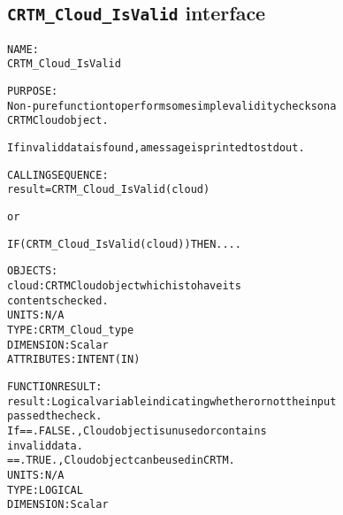 \subsection{\texttt{CRTM\_Cloud\_IsValid} interface}
  \label{sec:CRTM_Cloud_IsValid_interface}
  \begin{alltt}
 
  NAME:
        CRTM_Cloud_IsValid
 
  PURPOSE:
        Non-pure function to perform some simple validity checks on a
        CRTM Cloud object. 
 
        If invalid data is found, a message is printed to stdout.
 
  CALLING SEQUENCE:
        result = CRTM_Cloud_IsValid( cloud )
 
          or
 
        IF ( CRTM_Cloud_IsValid( cloud ) ) THEN....
 
  OBJECTS:
        cloud:         CRTM Cloud object which is to have its
                       contents checked.
                       UNITS:      N/A
                       TYPE:       CRTM_Cloud_type
                       DIMENSION:  Scalar
                       ATTRIBUTES: INTENT(IN)
 
  FUNCTION RESULT:
        result:        Logical variable indicating whether or not the input
                       passed the check.
                       If == .FALSE., Cloud object is unused or contains
                                      invalid data.
                          == .TRUE.,  Cloud object can be used in CRTM.
                       UNITS:      N/A
                       TYPE:       LOGICAL
                       DIMENSION:  Scalar
 
  \end{alltt}
